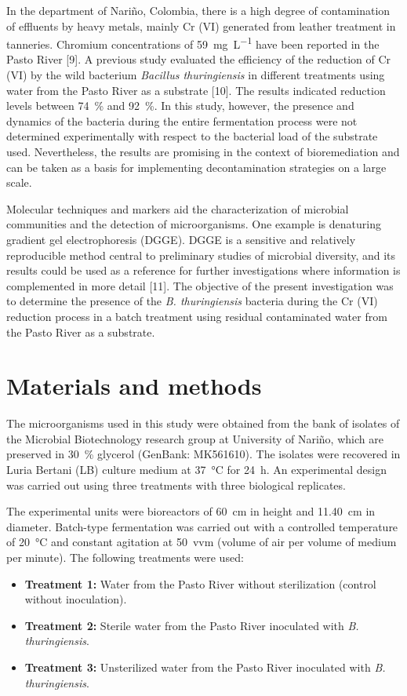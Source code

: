 \documentclass{univsciauth}
\begin{document}
In the department of Nariño, Colombia, there is a high degree of
contamination of effluents by heavy metals, mainly Cr (VI) generated
from leather treatment in tanneries. Chromium concentrations of \SI{59}{mg.L^{-1}}
have been reported in the Pasto River {[}9{]}. A previous study
evaluated the efficiency of the reduction of Cr (VI) by the wild
bacterium \emph{Bacillus thuringiensis} in different treatments using
water from the Pasto River as a substrate {[}10{]}. The results
indicated reduction levels between \SI{74}{\%} and \SI{92}{\%}. In this study,
however, the presence and dynamics of the bacteria during the entire
fermentation process were not determined experimentally with respect to
the bacterial load of the substrate used. Nevertheless, the results are
promising in the context of bioremediation and can be taken as a basis
for implementing decontamination strategies on a large scale.

Molecular techniques and markers aid the characterization of microbial
communities and the detection of microorganisms. One example is
denaturing gradient gel electrophoresis (DGGE). DGGE is a sensitive and
relatively reproducible method central to preliminary studies of
microbial diversity, and its results could be used as a reference for
further investigations where information is complemented in more detail
{[}11{]}. The objective of the present investigation was to determine
the presence of the \emph{B. thuringiensis} bacteria during the Cr (VI)
reduction process in a batch treatment using residual contaminated water
from the Pasto River as a substrate.

\section{Materials and methods}

The microorganisms used in this study were obtained from the
bank of isolates of the Microbial Biotechnology research group at
University of Nariño, which are preserved in \SI{30}{\%} glycerol (GenBank:
MK561610). The isolates were recovered in Luria Bertani (LB)
culture medium at \SI{37}{\celsius} for \SI{24}{h}. An experimental design was
carried out using three treatments with three biological replicates.

The experimental units were bioreactors of \SI{60}{cm} in height and
\SI{11.40}{cm} in diameter. Batch-type fermentation was carried out with a
controlled temperature of \SI{20}{\celsius} and constant agitation at \SI{50}{vvm}
(volume of air per volume of medium per minute). The following treatments were
used:
\begin{itemize}
        \item \textbf{Treatment 1:} Water from the Pasto River without
                sterilization (control without inoculation).
        \item \textbf{Treatment 2:} Sterile water from the Pasto River
                inoculated with \emph{B. thuringiensis}.
        \item \textbf{Treatment 3:} Unsterilized water from the Pasto River
                inoculated with \emph{B. thuringiensis}.
\end{itemize}
\end{document}
